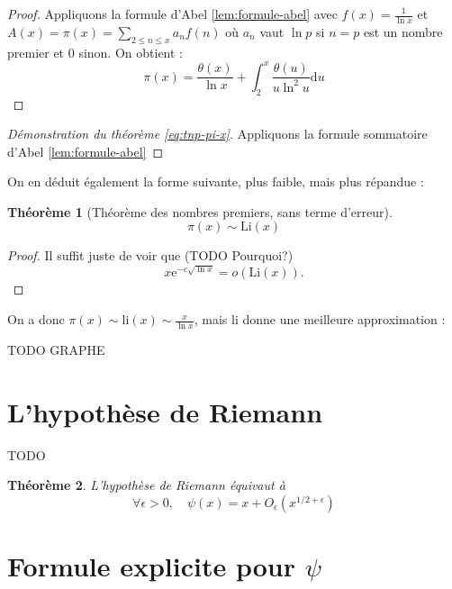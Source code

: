 \documentclass[french]{report}
\newtheorem{theorem}{Théorème}[section]
\begin{document}
\begin{proof}
  Appliquons la formule d'Abel \ref{lem:formule-abel} avec $f(x)=\frac{1}{\ln x}$ et $A(x)=\pi(x)=\sum_{2\leq n\leq x}a_nf(n)$ où $a_n$ vaut $\ln p$ si $n=p$ est un nombre premier et 0 sinon. On obtient :
  \[
    \pi(x)
    = \frac{\theta(x)}{\ln x}
    + \int_2^x{\frac{\theta(u)}{u\ln^2u}}\mathrm{d}u
  \]
\end{proof}

\begin{proof}[Démonstration du théorème \ref{eq:tnp-pi-x}]
  Appliquons la formule sommatoire d'Abel \ref{lem:formule-abel}
\end{proof}

On en déduit également la forme suivante, plus faible, mais plus répandue :

\begin{theorem}[Théorème des nombres premiers, sans terme d'erreur]\label{eq:tnp-equivalence}
  \[ \pi(x)\sim\mathrm{Li}(x) \]
\end{theorem}

\begin{proof}
  Il suffit juste de voir que (TODO Pourquoi?)
  \[ x\mathrm{e}^{-c\sqrt{\ln x}} = o(\mathrm{Li}(x)). \]
\end{proof}

On a donc $\pi(x)\sim\mathrm{li}(x)\sim\frac{x}{\ln x}$, mais $\mathrm{li}$ donne une meilleure approximation :

TODO GRAPHE

\section{L'hypothèse de Riemann}

TODO

\begin{theorem}
  L'hypothèse de Riemann équivaut à
  \[ \forall\epsilon>0,\quad\psi(x)=x+O_\epsilon(x^{1/2+\epsilon}) \]
\end{theorem}

\section{Formule explicite pour $\psi$}



% 
\end{document}
